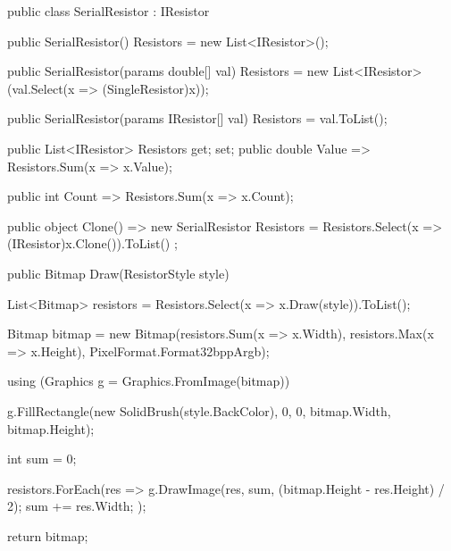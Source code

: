 \documentclass{article}
\begin{document}
\begin{Csharp}[caption=Klasse SerialResistor,label=LIS:Serial] 
public class SerialResistor : IResistor
{
    public SerialResistor()
    {
        Resistors = new List<IResistor>();
    }

    public SerialResistor(params double[] val)
    {
        Resistors = new List<IResistor>(val.Select(x => (SingleResistor)x));
    }

    public SerialResistor(params IResistor[] val)
    {
        Resistors = val.ToList();
    }

    public List<IResistor> Resistors { get; set; }
    public double Value  => Resistors.Sum(x => x.Value);

    public int Count => Resistors.Sum(x => x.Count);

    public object Clone() => new SerialResistor { Resistors = Resistors.Select(x => (IResistor)x.Clone()).ToList() };

    public Bitmap Draw(ResistorStyle style)
    {
        List<Bitmap> resistors = Resistors.Select(x => x.Draw(style)).ToList();

        Bitmap bitmap = new Bitmap(resistors.Sum(x => x.Width), resistors.Max(x => x.Height), PixelFormat.Format32bppArgb);

        using (Graphics g = Graphics.FromImage(bitmap))
        {
            g.FillRectangle(new SolidBrush(style.BackColor), 0, 0, bitmap.Width, bitmap.Height);

            int sum = 0;

            resistors.ForEach(res =>
            {
                g.DrawImage(res, sum, (bitmap.Height - res.Height) / 2);
                sum += res.Width;
            });
        }

        return bitmap;
    }
}
\end{Csharp}
\end{document}
